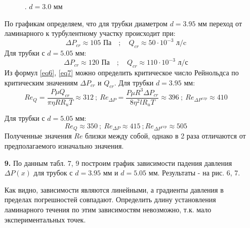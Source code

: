 \documentclass[a4paper]{article}
\begin{document}
\begin{itemize}
\begin{figure}
\caption{. $d = 3.0$ мм}
\end{figure}

\noindent
По графикам определяем, что для трубки диаметром $d = 3.95$ мм переход от ламинарного к турбулентному участку происходит при:
\[\Delta P_{cr} \approx 105 \text{ Па} \quad ; \quad Q_{cr} \approx 50 \cdot 10^{-3} \text{ л/c} \]
Для трубки с $d = 5.05$ мм:
\[\Delta P_{cr} \approx 120 \text{ Па} \quad ; \quad Q_{cr} \approx 110 \cdot 10^{-3} \text{ л/с} \]
Из формул \eqref{eq6}, \eqref{eq7} можно определить критическое число Рейнольдса по критическим значениям $\Delta P_{cr}$ и $Q_{cr}$. Для трубки $d = 3.95$ мм:
\[Re_{Q} = \frac{P \mu Q_{cr}}{\pi \eta R R_u T} \approx 312 \ ; \ Re_{\Delta P} = \frac{P \mu R^3 \Delta P_{cr}}{8\eta^2 l R_u T} \approx 396 \ ; \ Re_{\Delta P^{exp}} \approx 410\] 

\noindent
Для трубки с $d = 5.05$ мм:
\[Re_{Q} \approx 350 \ ; \  Re_{\Delta P} \approx 415 \ ; Re_{\Delta P^{exp}} \approx 505 \]
Полученные значения $Re$ близки между собой, однако в 2 раза отличаются от предполагаемого изначально значения.
\item[\textbf{9.}] По данным табл. 7, 9 построим график зависимости падения давления $\Delta P(x)$ для трубок с $d = 3.95$ мм и $d = 5.05$ мм. Результаты - на рис. 6, 7.

\noindent
Как видно, зависимости являются линейными, а градиенты давления в пределах погрешностей совпадают. Определить длину установления ламинарного течения по этим зависимостям невозможно, т.к. мало экспериментальных точек.
\end{itemize}
\end{document}
